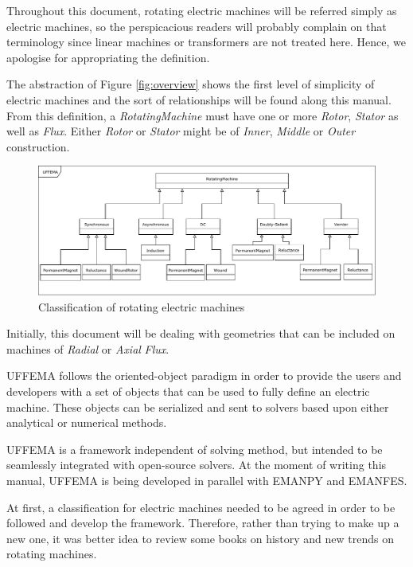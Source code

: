 \documentclass[justified]{tufte-book} %
\begin{document}
Throughout this document, rotating electric machines will be referred simply as electric machines, so the perspicacious readers will probably complain on that terminology since linear machines or transformers are not treated here.  Hence, we apologise for appropriating the definition.     
\begin{fullwidth}
The abstraction of Figure \ref{fig:overview} shows the first level of simplicity of electric machines and the sort of relationships will be found along this manual. From this definition, a \textit{RotatingMachine} must have one or more \textit{Rotor}, \textit{Stator} as well as \textit{Flux}. Either \textit{Rotor} or \textit{Stator} might be of \textit{Inner}, \textit{Middle} or \textit{Outer} construction.
\end{fullwidth}
 \begin{figure}[h]
 \includegraphics[width=\linewidth]{RotatingMachine.pdf}
 \caption{Classification of rotating electric machines 
 }
 \label{fig:fullfig}
 \end{figure} 

Initially, this document will be dealing with geometries that can be included on machines of \textit{Radial} or \textit{Axial} \textit{Flux}.

UFFEMA follows the oriented-object paradigm in order to provide the users and developers with a set of objects that can be used to fully define an electric machine. These objects can be serialized and sent to solvers based upon either analytical or numerical methods.

UFFEMA is a framework independent of solving method, but intended to be seamlessly integrated with open-source solvers. At the moment of writing this manual, UFFEMA is being developed in parallel with EMANPY\cite{ajpina_emanpy_2018} and EMANFES\cite{ajpina_emanfes_2018}.  

At first, a classification for electric machines needed to be agreed in order to be followed and develop the framework. Therefore, rather than trying to make up a new one, it was better idea to review some books on history and new trends on rotating machines. 
\end{document}
